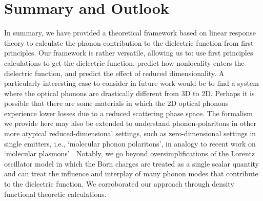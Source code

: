 \documentclass[aps,prb,twocolumn,
	groupedaddress,superscriptaddress,
	amsfonts,amssymb,amsmath,floatfix,
	citeautoscript]{revtex4-1}
\begin{document}



\section{Summary and Outlook}

In summary, we have provided a theoretical framework based on linear response theory to calculate the phonon contribution to the dielectric function from first principles. Our framework is rather versatile, allowing us to: use first principles calculations to get the dielectric function, predict how nonlocality enters the dielectric function, and predict the effect of reduced dimensionality. A particularly interesting case to consider in future work would be to find a system where the optical phonons are drastically different from 3D to 2D. Perhaps it is possible that there are some materials in which the 2D optical phonons experience lower losses due to a reduced scattering phase space. The formalism we provide here may also be extended to understand phonon-polaritons in other more atypical reduced-dimensional settings, such as zero-dimensional settings in single emitters, i.e., `molecular phonon polaritons', in analogy to recent work on `molecular plasmons' \cite{manjavacas2013tunable,lauchner2015molecular}. Notably, we go beyond oversimplifications of the Lorentz oscillator model in which the Born charges are treated as a single scalar quantity and can treat the influence and interplay of many phonon modes that contribute to the dielectric function. We corroborated our approach through density functional theoretic calculations.
\end{document}
